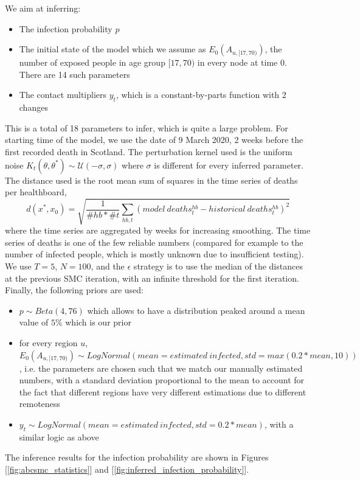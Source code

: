 \documentclass[11pt]{article}
\begin{document}
We aim at inferring:
\begin{itemize}
\item The infection probability $p$
\item The initial state of the model which we assume as $E_0(A_{u,[17, 70)})$, the number of exposed people in age group $[17,70)$ in every node at time 0. There are 14 such parameters
\item The contact multipliers $y_t$, which is a constant-by-parts function with 2 changes
\end{itemize}

This is a total of 18 parameters to infer, which is quite a large problem. For starting time of the model, we use the date of 9 March 2020, 2 weeks before the first recorded death in Scotland. The perturbation kernel used is the uniform noise $K_t(\theta, \theta^*) \sim \mathcal{U}(-\sigma, \sigma)$ where $\sigma$ is different for every inferred parameter. The distance used is the root mean sum of squares in the time series of deaths per healthboard, $$d(x^*, x_0)=\sqrt{\frac{1}{\#hb * \#t}\sum_{hb, t} (model \ deaths^{hb}_t - historical \ deaths^{hb}_t)^2}$$ where the time series are aggregated by weeks for increasing smoothing. The time series of deaths is one of the few reliable numbers (compared for example to the number of infected people, which is mostly unknown due to insufficient testing). We use $T=5$, $N=100$, and the $\epsilon$ strategy is to use the median of the distances at the previous SMC iteration, with an infinite threshold for the first iteration. Finally, the following priors are used:

\begin{itemize}
\item $p \sim Beta(4, 76)$ which allows to have a distribution peaked around a mean value of $5\%$ which is our prior
\item for every region $u$, $E_0(A_{u,[17, 70)}) \sim LogNormal(mean=estimated \ infected, std=max(0.2 * mean, 10))$, i.e. the parameters are chosen such that we match our manually estimated numbers, with a standard deviation proportional to the mean to account for the fact that different regions have very different estimations due to different remoteness
\item $y_t \sim LogNormal(mean=estimated \ infected, std=0.2 * mean)$, with a similar logic as above
\end{itemize}

The inference results for the infection probability are shown in Figures [\ref{fig:abcsmc_statistics}] and [\ref{fig:inferred_infection_probability}].
\end{document}
